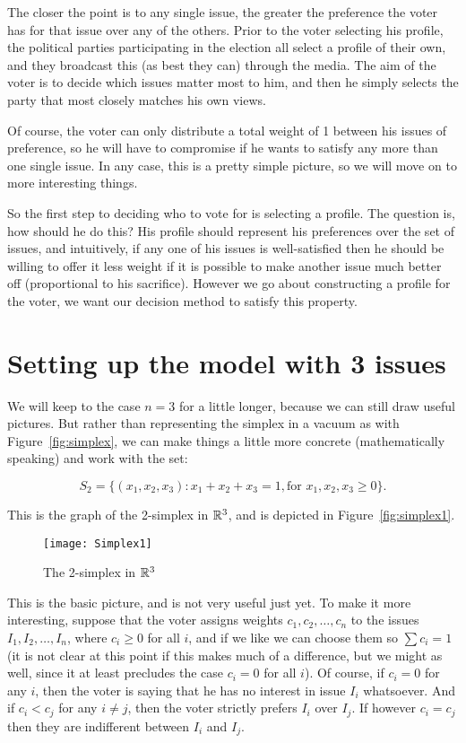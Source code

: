 \documentclass[
10pt, %
a4paper, %
oneside, %
headinclude,footinclude, %
BCOR5mm, %
]{scrartcl}
\begin{document}
The closer the point is to any single issue, the greater the preference the voter has for that issue over any of the others. Prior to the voter selecting his profile, the political parties participating in the election all select a profile of their own, and they broadcast this (as best they can) through the media. The aim of the voter is to decide which issues matter most to him, and then he simply selects the party that most closely matches his own views.

Of course, the voter can only distribute a total weight of 1 between his issues of preference, so he will have to compromise if he wants to satisfy any more than one single issue. In any case, this is a pretty simple picture, so we will move on to more interesting things.

So the first step to deciding who to vote for is selecting a profile. The question is, how should he do this? His profile should represent his preferences over the set of issues, and intuitively, if any one of his issues is well-satisfied then he should be willing to offer it less weight if it is possible to make another issue much better off (proportional to his sacrifice). However we go about constructing a profile for the voter, we want our decision method to satisfy this property.

\section{Setting up the model with 3 issues}

We will keep to the case $n=3$ for a little longer, because we can still draw useful pictures. But rather than representing the simplex in a vacuum as with Figure~\vref{fig:simplex}, we can make things a little more concrete (mathematically speaking) and work with the set:

$$S_2 = \{(x_1,x_2,x_3) \colon x_1+x_2+x_3 = 1, \textrm{for } x_1,x_2,x_3 \geq 0\}.$$

This is the graph of the 2-simplex in $\R^3$, and is depicted in Figure~\vref{fig:simplex1}.

\begin{figure}[h]
\centering 
\texttt{[image: Simplex1]} 
\caption[The 2-simplex in $\R^3$]{The 2-simplex in $\R^3$} %
\label{fig:simplex1} 
\end{figure}

This is the basic picture, and is not very useful just yet. To make it more interesting, suppose that the voter assigns weights $c_1,c_2,\ldots,c_n$ to the issues $I_1,I_2,\ldots,I_n$, where $c_i\geq 0$ for all $i$, and if we like we can choose them so $\sum c_i = 1$ (it is not clear at this point if this makes much of a difference, but we might as well, since it at least precludes the case $c_i = 0$ for all $i$). Of course, if $c_i = 0$ for any $i$, then the voter is saying that he has no interest in issue $I_i$ whatsoever. And if $c_i < c_j$ for any $i\neq j$, then the voter strictly prefers $I_i$ over $I_j$. If however $c_i = c_j$ then they are indifferent between $I_i$ and $I_j$.
\end{document}
